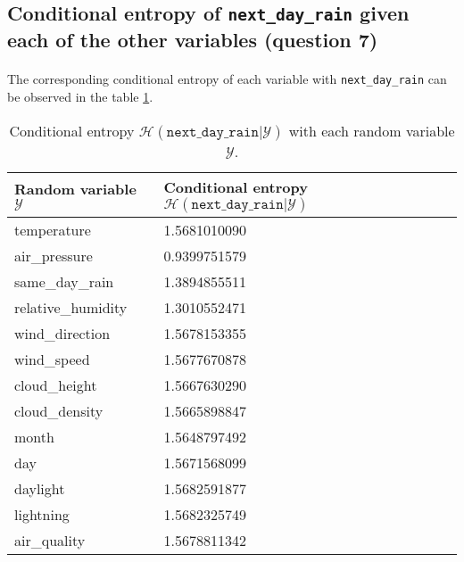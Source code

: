 \documentclass[a4paper, 11pt, oneside]{article}
\begin{document}
\subsection{Conditional entropy of \texttt{next\_day\_rain} given each of the other variables (question 7)}

\paragraph{}The corresponding conditional entropy of each variable with \texttt{next\_day\_rain} can be observed in the table \ref{table:q7}.

\begin{table}[H]
    \centering
    \begin{tabular}{|l|l|}
    \hline
    \textbf{Random variable $\mathcal{Y}$} & \textbf{Conditional entropy $\mathcal{H}(\texttt{next\_day\_rain} | \mathcal{Y})$} \\ \hline
    temperature            & 1.5681010090           \\ \hline
    air\_pressure          & 0.9399751579          \\ \hline
    same\_day\_rain        & 1.3894855511          \\ \hline
    relative\_humidity     & 1.3010552471        \\ \hline
    wind\_direction        & 1.5678153355            \\ \hline
    wind\_speed            & 1.5677670878            \\ \hline
    cloud\_height          & 1.5667630290             \\ \hline
    cloud\_density         & 1.5665898847            \\ \hline
    month                  & 1.5648797492           \\ \hline
    day                    & 1.5671568099          \\ \hline
    daylight               & 1.5682591877            \\ \hline
    lightning              & 1.5682325749             \\ \hline
    air\_quality           & 1.5678811342            \\ \hline
    \end{tabular}
    \caption{Conditional entropy $\mathcal{H}(\texttt{next\_day\_rain} | \mathcal{Y})$ with each random variable $\mathcal{Y}$.}
    \label{table:q7}
    \end{table}
\end{document}

